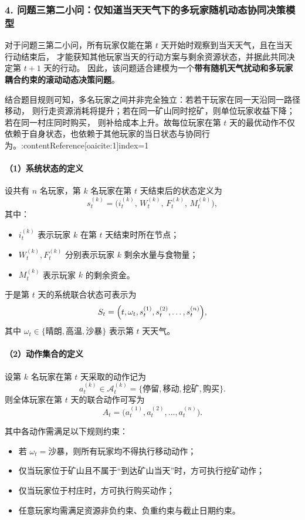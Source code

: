 \documentclass[UTF8,a4paper,12pt]{ctexart}
\begin{document}
\subsubsection*{4. 问题三第二小问：仅知道当天天气下的多玩家随机动态协同决策模型}

对于问题三第二小问，所有玩家仅能在第 $t$ 天开始时观察到当天天气，且在当天行动结束后，
才能获知其他玩家当天的行动方案与剩余资源状态，并据此共同决定第 $t+1$ 天的行动。
因此，该问题适合建模为一个\textbf{带有随机天气扰动和多玩家耦合约束的滚动动态决策问题}。

结合题目规则可知，多名玩家之间并非完全独立：若若干玩家在同一天沿同一路径移动，
则行走资源消耗将提升；若在同一矿山同时挖矿，则单位玩家收益下降；若在同一村庄同时购买，
则补给成本上升。故每位玩家在第 $t$ 天的最优动作不仅依赖于自身状态，也依赖于其他玩家的当日状态与协同行为。:contentReference[oaicite:1]{index=1}

\paragraph{（1）系统状态的定义}

设共有 $n$ 名玩家，第 $k$ 名玩家在第 $t$ 天结束后的状态定义为
\[
s_t^{(k)}=\bigl(i_t^{(k)},\,W_t^{(k)},\,F_t^{(k)},\,M_t^{(k)}\bigr),
\]
其中：
\begin{itemize}
    \item $i_t^{(k)}$ 表示玩家 $k$ 在第 $t$ 天结束时所在节点；
    \item $W_t^{(k)},F_t^{(k)}$ 分别表示玩家 $k$ 剩余水量与食物量；
    \item $M_t^{(k)}$ 表示玩家 $k$ 的剩余资金。
\end{itemize}

于是第 $t$ 天的系统联合状态可表示为
\[
S_t=\Bigl(t,\omega_t,s_t^{(1)},s_t^{(2)},\ldots,s_t^{(n)}\Bigr),
\]
其中 $\omega_t\in\{\text{晴朗},\text{高温},\text{沙暴}\}$ 表示第 $t$ 天天气。

\paragraph{（2）动作集合的定义}

设第 $k$ 名玩家在第 $t$ 天采取的动作记为
\[
a_t^{(k)}\in\mathcal{A}_t^{(k)}=\{\text{停留},\text{移动},\text{挖矿},\text{购买}\}.
\]
则全体玩家在第 $t$ 天的联合动作可写为
\[
A_t=\bigl(a_t^{(1)},a_t^{(2)},\ldots,a_t^{(n)}\bigr).
\]

其中各动作需满足以下规则约束：
\begin{itemize}
    \item 若 $\omega_t=\text{沙暴}$，则所有玩家均不得执行移动动作；
    \item 仅当玩家位于矿山且不属于“到达矿山当天”时，方可执行挖矿动作；
    \item 仅当玩家位于村庄时，方可执行购买动作；
    \item 任意玩家均需满足资源非负约束、负重约束与截止日期约束。
\end{itemize}
\end{document}
